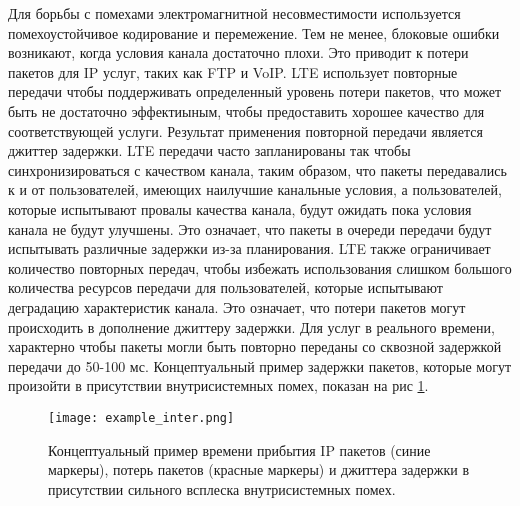 Для борьбы с помехами электромагнитной несовместимости используется помехоустойчивое кодирование и перемежение. Тем не менее, блоковые ошибки возникают, когда условия канала достаточно плохи. Это приводит к потери пакетов для IP услуг, таких как FTP и VoIP. LTE использует повторные передачи чтобы поддерживать определенный уровень потери пакетов, что может быть не достаточно эффектиыным, чтобы предоставить хорошее качество для соответствующей услуги. Результат применения повторной передачи является джиттер задержки.
LTE передачи часто запланированы так чтобы синхронизироваться с качеством канала, таким образом, что пакеты передавались к и от пользователей, имеющих наилучшие канальные условия, а пользователей, которые испытывают провалы качества канала, будут ожидать пока условия канала не будут улучшены. Это означает, что пакеты в очереди передачи будут испытывать различные задержки из-за планирования.
LTE также ограничивает количество повторных передач, чтобы избежать использования слишком большого количества ресурсов передачи для пользователей, которые испытывают деградацию характеристик канала. Это означает, что потери пакетов могут происходить в дополнение джиттеру задержки. Для услуг в реального времени, характерно чтобы пакеты могли быть повторно переданы со сквозной задержкой передачи до 50-100 мс.
Концептуальный пример задержки пакетов, которые могут произойти в присутствии внутрисистемных помех, показан на рис \ref{img:example_inter}.
\begin{figure} [h]
  \center
\texttt{[image: example\_inter.png]}
  \caption{Концептуальный пример времени прибытия IP пакетов (синие маркеры), потерь пакетов (красные маркеры) и джиттера задержки в присутствии сильного всплеска внутрисистемных помех.}
  \label{img:example_inter}
\end{figure}

